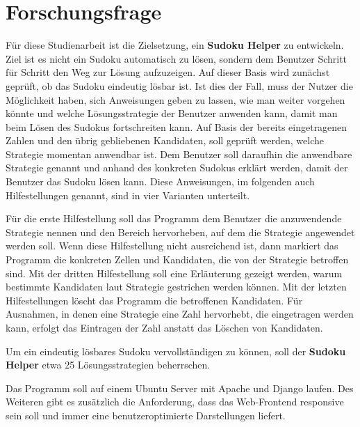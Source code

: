 \section{Forschungsfrage}
Für diese Studienarbeit ist die Zielsetzung, ein \textbf{Sudoku Helper} zu entwickeln. Ziel ist es nicht ein Sudoku automatisch zu lösen, sondern dem Benutzer Schritt für Schritt den Weg zur Lösung aufzuzeigen. Auf dieser Basis wird zunächst geprüft, ob das Sudoku eindeutig lösbar ist. Ist dies der Fall, muss der Nutzer die Möglichkeit haben, sich Anweisungen geben zu lassen, wie man weiter vorgehen könnte und welche Lösungsstrategie der Benutzer anwenden kann, damit man beim Lösen des Sudokus fortschreiten kann. Auf Basis der bereits eingetragenen Zahlen und den übrig gebliebenen Kandidaten, soll geprüft werden, welche Strategie momentan anwendbar ist. Dem Benutzer soll daraufhin die anwendbare Strategie genannt und anhand des konkreten Sudokus erklärt werden, damit der Benutzer das Sudoku lösen kann. Diese Anweisungen, im folgenden auch Hilfestellungen genannt, sind in vier Varianten unterteilt.

Für die erste Hilfestellung soll das Programm dem Benutzer die anzuwendende Strategie nennen und den Bereich hervorheben, auf dem die Strategie angewendet werden soll. Wenn diese Hilfestellung nicht ausreichend ist, dann markiert das Programm die konkreten Zellen und Kandidaten, die von der Strategie betroffen sind. Mit der dritten Hilfestellung soll eine Erläuterung gezeigt werden, warum bestimmte Kandidaten laut Strategie gestrichen werden können. Mit der letzten Hilfestellungen löscht das Programm die betroffenen Kandidaten. Für Ausnahmen, in denen eine Strategie eine Zahl hervorhebt, die eingetragen werden kann, erfolgt das Eintragen der Zahl anstatt das Löschen von Kandidaten.

Um ein eindeutig lösbares Sudoku vervollständigen zu können, soll der \textbf{Sudoku Helper} etwa 25 Lösungsstrategien beherrschen.

Das Programm soll auf einem Ubuntu Server mit Apache und Django laufen. Des Weiteren gibt es zusätzlich die Anforderung, dass das Web-Frontend responsive sein soll und immer eine benutzeroptimierte Darstellungen liefert.